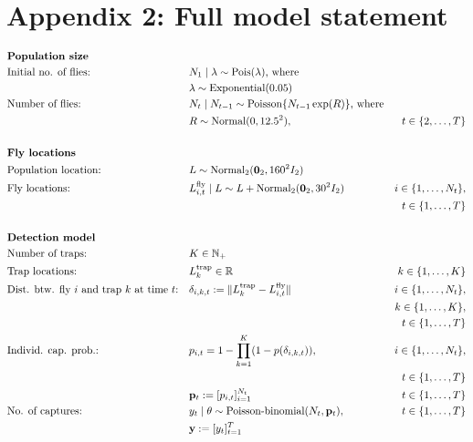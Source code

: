 \documentclass[
]{book}
\begin{document}
\hypertarget{appendix-2-full-model-statement}{%
\section{Appendix 2: Full model statement}\label{appendix-2-full-model-statement}}

\[
\renewcommand{\baselinestretch}{1}\normalsize
\begin{aligned}
&\textbf{Population size} \\
&\text{Initial no. of flies:} && N_1 \mid \lambda \sim \mathrm{Pois}(\lambda) \text{, where} \\
&&& \lambda \sim \mathrm{Exponential}(0.05) \\
& \text{Number of flies:}~ && N_t \mid N_{t-1}  \sim \mathrm{Poisson}\{ N_{t-1} \exp(R) \} \text{, where} \\ & &&R \sim \mathrm{Normal}(0, 12.5^2), & t \in \{2, \ldots, T \} \\
\\
&\textbf{Fly locations} \\
& \text{Population location:} ~ && L \sim \mathrm{Normal_2}(\mathbf 0_2, 160^2 I_2) \\
& \text{Fly locations:}~ && L_{i,t}^\text{fly} \mid L \sim L + \mathrm{Normal}_2(\mathbf 0_2, 30^2 I_2) & i \in \{1, \ldots, N_t\}, \\
  &&&& t \in \{1, \ldots, T\}\\
\\
&\textbf{Detection model} \\
& \text{Number of traps:}~ && K \in \mathbb N_+ \\
& \text{Trap locations:}~ && L_k^\text{trap} \in \mathbb R & k \in \{1, \ldots, K\} \\
& \text{Dist. btw. fly } i \text{ and trap } k \text{ at time } t \text{:} && \delta_{i,k,t} := \lVert L_k^\text{trap} - L_{i,t}^\text{fly} \rVert & i \in \{1, \ldots, N_t\}, \\
  &&&& k \in \{1, \ldots, K\}, \\
  &&&& t \in \{1, \ldots, T\}\\
& \text{Individ. cap. prob.:} && p_{i, t} = 1 - \prod_{k=1}^K (1 - p(\delta_{i,k,t})), & i \in \{1, \ldots, N_t\}, \\
  &&&& t \in \{1, \ldots, T\}\\
&  && \mathbf p_t := [p_{i,t}]_{i=1}^{N_t}  & t \in \{1, \ldots, T\} \\
&\text{No. of captures:}~ && y_t \mid \theta \sim \text{Poisson-binomial}(N_t, \mathbf p_t), & t \in \{1, \ldots, T\} \\
  &&& \mathbf y := [y_t]_{t=1}^T
\end{aligned}
\renewcommand{\baselinestretch}{1}\normalsize
\]
\end{document}
